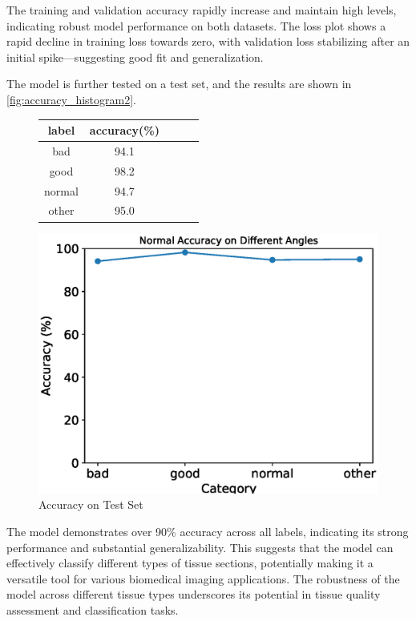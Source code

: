 The training and validation accuracy rapidly increase and maintain high levels, indicating robust model performance on both datasets. The loss plot shows a rapid decline in training loss towards zero, with validation loss stabilizing after an initial spike—suggesting good fit and generalization.

The model is further tested on a test set, and the results are shown in \autoref{fig:accuracy_histogram2}.

\begin{figure}[H]
    \begin{minipage}{0.45\textwidth}
        \centering
        \begin{tabular}{ccccc}
            \toprule
            label & accuracy(\%) \\
            \midrule
            bad & 94.1 \\
            good & 98.2 \\
            normal & 94.7 \\
            other & 95.0 \\
            \bottomrule
        \end{tabular}
        \label{tab:model_accuracy3}
    \end{minipage}
    \begin{minipage}{0.45\textwidth}
        \centering
        \includegraphics[width=\textwidth]{./fig/assistplot/angle_accuracy2.eps}
        \caption{Accuracy on Test Set}
        \label{fig:accuracy_histogram2}
    \end{minipage}
\end{figure}

The model demonstrates over 90\% accuracy across all labels, indicating its strong performance and substantial generalizability. This suggests that the model can effectively classify different types of tissue sections, potentially making it a versatile tool for various biomedical imaging applications.
The robustness of the model across different tissue types underscores its potential in tissue quality assessment and classification tasks.

